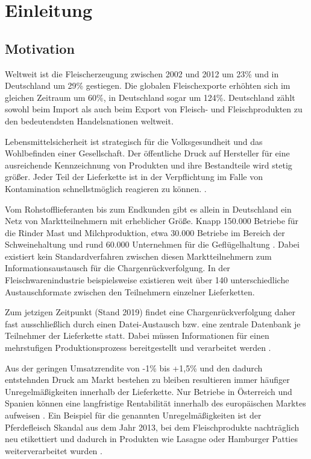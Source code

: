 \section{Einleitung}

\subsection{Motivation} \label{Motivation}

\begin{displayquote}
  \glqq Weltweit ist die Fleischerzeugung zwischen 2002 und 2012 um 23\% und in Deutschland um 29\% gestiegen. Die globalen Fleischexporte erhöhten sich im gleichen Zeitraum um 60\%, in Deutschland sogar um 124\%. Deutschland zählt sowohl beim Import als auch beim Export von Fleisch- und Fleischprodukten zu den bedeutendsten Handelsnationen weltweit.\grqq{}
\end{displayquote}

\begin{flushright}
  \citet{Efken2015}
\end{flushright}

Lebensmittelsicherheit ist strategisch für die Volksgesundheit und das Wohlbefinden einer Gesellschaft. Der öffentliche Druck auf Hersteller für eine ausreichende Kennzeichnung von Produkten und ihre Bestandteile wird stetig größer. Jeder Teil der Lieferkette ist in der Verpflichtung im Falle von Kontamination schnellstmöglich reagieren zu können. \citep{EPER2002}.

Vom Rohstofflieferanten bis zum Endkunden gibt es allein in Deutschland ein Netz von Marktteilnehmern mit erheblicher Größe. Knapp 150.000 Betriebe für die Rinder Mast und Milchproduktion, etwa 30.000 Betriebe im Bereich der Schweinehaltung und rund 60.000 Unternehmen für die Geflügelhaltung \citep{Efken2015}. Dabei existiert kein Standardverfahren zwischen diesen Marktteilnehmern zum Informationsaustausch für die Chargenrückverfolgung. In der Fleischwarenindustrie beispielsweise existieren weit über 140 unterschiedliche Austauschformate zwischen den Teilnehmern einzelner Lieferketten.

Zum jetzigen Zeitpunkt (Stand 2019) findet eine Chargenrückverfolgung daher fast ausschließlich durch einen Datei-Austausch bzw. eine zentrale Datenbank je Teilnehmer der Lieferkette statt. Dabei müssen Informationen für einen mehrstufigen Produktionsprozess bereitgestellt und verarbeitet werden \citep{Siepermann2015}.

Aus der geringen Umsatzrendite von -1\% bis +1,5\%  und den dadurch entstehnden Druck am Markt bestehen zu bleiben resultieren immer häufiger Unregelmäßigkeiten innerhalb der Lieferkette. Nur Betriebe in Österreich und Spanien können eine langfristige Rentabilität innerhalb des europäischen Marktes aufweisen \citep{Efken2015}. Ein Beispiel für die genannten Unregelmäßigkeiten ist der \glqq Pferdefleisch Skandal\grqq{} aus dem Jahr 2013, bei dem Fleischprodukte nachträglich neu etikettiert und dadurch in Produkten wie Lasagne oder Hamburger Patties weiterverarbeitet wurden \citep{Bundespartei}.


